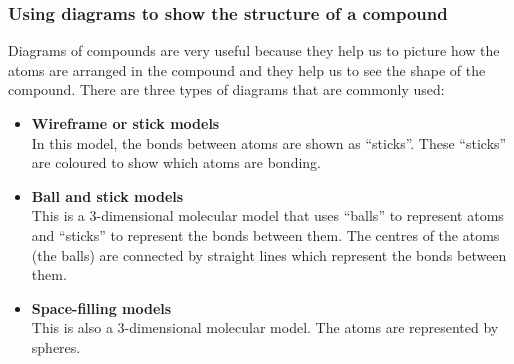 \label{m38120*uid4}\subsubsection*{Using diagrams to show the structure of a compound}
Diagrams of compounds are very useful because they help us to picture how the atoms are arranged in the compound and they help us to see the shape of the compound. There are three types of diagrams that are commonly used:
\label{m38120*id307860}\begin{itemize}[noitemsep]
\item \textbf{Wireframe or stick models} \\
In this model, the bonds between atoms are shown as ``sticks''. These ``sticks'' are coloured to show which atoms are bonding.
\item \textbf{Ball and stick models} \\
This is a 3-dimensional molecular model that uses ``balls'' to represent atoms and ``sticks'' to represent the bonds between them. The centres of the atoms (the balls) are connected by straight lines which represent the bonds between them.
\item \textbf{Space-filling models} \\
This is also a 3-dimensional molecular model. The atoms are represented by spheres.
\end{itemize}
